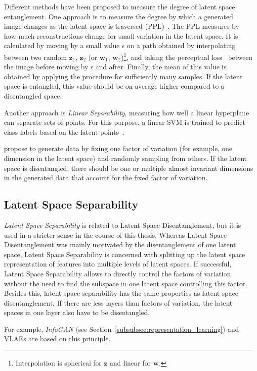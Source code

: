 Different methods have been proposed to measure the degree of latent space entanglement.
One approach is to measure the degree by which a generated image changes as the latent space is traversed (\ac{PPL})~\citep{karras2019style}.
The \ac{PPL} measures by how much reconstructions change for small variation in the latent space.
It is calculated by moving by a small value $\epsilon$ on a path obtained by interpolating between two random $\bm{z}_1$, $\bm{z}_2$ (or $\bm{w}_1$, $\bm{w}_2$)\footnote{Interpolation is spherical for $\bm{z}$ and linear for $\bm{w}$.}, and taking the perceptual loss~\citep{johnson2016perceptual} between the image before moving by $\epsilon$ and after.
Finally, the mean of this value is obtained by applying the procedure for sufficiently many samples.
If the latent space is entangled, this value should be on average higher compared to a disentangled space.

Another approach is \textit{Linear Separability}, measuring how well a linear hyperplane can separate sets of points.
For this purpose, a linear \ac{SVM} is trained to predict class labels based on the latent points~\citep{karras2019style}.

\citet{kim2018disentangling} propose to generate data by fixing one factor of variation (for example, one dimension in the latent space) and randomly sampling from others.
If the latent space is disentangled, there should be one or multiple almost invariant dimensions in the generated data that account for the fixed factor of variation.

\subsection{Latent Space Separability}\label{subsec:feature-separability}

\textit{Latent Space Separability} is related to Latent Space Disentanglement, but it is used in a stricter sense in the course of this thesis.
Whereas Latent Space Disentanglement was mainly motivated by the disentanglement of one latent space, Latent Space Separability is concerned with splitting up the latent space representation of features into multiple levels of latent spaces.
If successful, Latent Space Separability allows to directly control the factors of variation without the need to find the subspace in one latent space controlling this factor.
Besides this, latent space separability has the same properties as latent space disentanglement.
If there are less layers than factors of variation, the latent spaces in one layer also have to be disentangled.

For example, \textit{InfoGAN} (see Section~\ref{subsubsec:representation_learning}) and \acp{VLAE} are based on this principle.